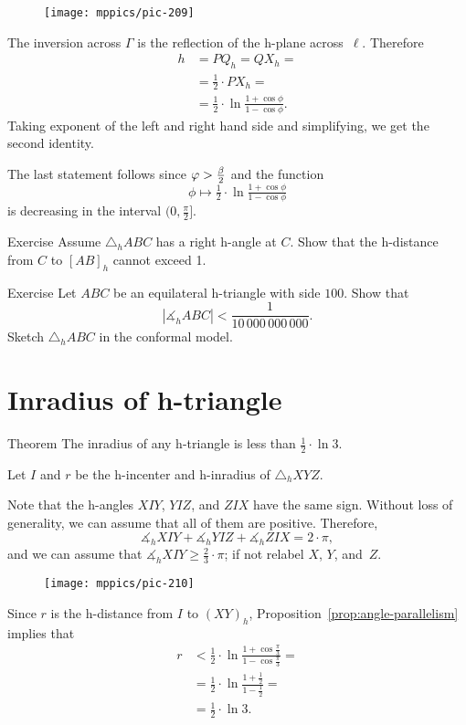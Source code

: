 \begin{wrapfigure}{o}{36mm}
\vskip-0mm
\centering
\texttt{[image: mppics/pic-209]}
\end{wrapfigure}

The inversion across $\Gamma$ is the reflection of the h-plane across~$\ell$. 
Therefore
\begin{align*}
h&=PQ_h=QX_h=
\\
&=\tfrac12\cdot PX_h=
\\
&=\tfrac12\cdot\ln \tfrac{1+\cos\phi}{1-\cos\phi}.
\end{align*}
Taking exponent of the left and right hand side and simplifying, we get the second identity.

The last statement follows since $\varphi>\tfrac\beta2$ and the function 
\[\phi\mapsto  \tfrac12\cdot\ln \tfrac{1+\cos\phi}{1-\cos\phi}\] 
is decreasing in the interval $(0,\tfrac\pi2]$.
\qeds

\begin{thm}{Exercise}\label{ex:right-angle-parallelism} 
Assume $\triangle_hABC$ has a right h-angle at $C$.
Show that the h-distance from $C$ to $[AB]_h$ cannot exceed 1.
\end{thm}

\begin{thm}{Exercise}\label{ex:small-angle}
Let $ABC$ be an equilateral h-triangle with side $100$.
Show that 
\[|\measuredangle_h ABC|<\frac1{10\,000\,000\,000}.\]
Sketch $\triangle_h ABC$ in the conformal model.
\end{thm}


\section{Inradius of h-triangle}

\begin{thm}{Theorem}\label{thm:h-inradius}
The inradius of any h-triangle 
is less than $\tfrac12\cdot\ln3$.
\end{thm}

Let $I$ and $r$ be the h-incenter and h-inradius of $\triangle_hXYZ$.

Note that the h-angles 
$XIY$, 
$YIZ$, and 
$ZIX$
have the same sign.
Without loss of generality, we can assume that all of them are positive.
Therefore,
\[\measuredangle_hXIY+ 
\measuredangle_hYIZ+ 
\measuredangle_hZIX=2\cdot\pi,
\]
and we can assume that
$\measuredangle_hXIY\ge\tfrac23\cdot\pi$;
if not relabel $X$, $Y$, and~$Z$.

{

\begin{wrapfigure}{o}{44mm}
\centering
\vskip-4mm
\texttt{[image: mppics/pic-210]}
\end{wrapfigure} 

Since $r$ is the h-distance from $I$ to $(XY)_h$,
Proposition~\ref{prop:angle-parallelism} implies that
\begin{align*}r&<\tfrac12\cdot\ln \tfrac{1+\cos\frac\pi3}{1-\cos\frac\pi3}=
\\
&=\tfrac12\cdot\ln\frac{1+\tfrac12}{1-\tfrac12}=
\\
&=\tfrac12\cdot\ln 3.
\end{align*}
\qedsf

}

